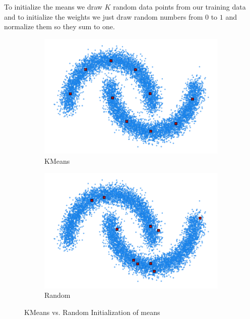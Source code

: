 To initialize the means we draw $K$ random data points from our training data and 
to initialize the weights we just draw random numbers from $0$ to $1$ and normalize them so they sum to one.

\begin{figure}[H]
    \centering
    \begin{subfigure}[b]{0.49\textwidth} 
        \centering
        \includegraphics[width=\textwidth]{figures/halfmoons/10_kmeans_data.png}
        \caption{KMeans}
    \end{subfigure}
    \begin{subfigure}[b]{0.49\textwidth} 
        \centering
        \includegraphics[width=\textwidth]{figures/halfmoons/10_random1_data.png} 
        \caption{Random}
    \end{subfigure} 
    \caption{KMeans vs. Random Initialization of means}
    \label{fig:kmeans_vs_rand}
\end{figure}

